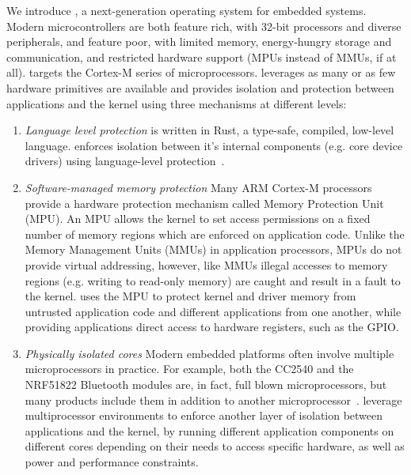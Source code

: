 We introduce \name, a next-generation operating system for embedded systems.
Modern microcontrollers are both feature rich, with 32-bit processors and
diverse peripherals, and feature poor, with limited memory, energy-hungry
storage and communication, and restricted hardware support (MPUs instead of
MMUs, if at all).
\name targets the Cortex-M series of microprocessors.  \name leverages as many
or as few hardware primitives are available and provides isolation and
protection between applications and the kernel using three mechanisms at
different levels:

\begin{enumerate}
  \item \emph{Language level protection} \name is written in Rust, a type-safe,
  compiled, low-level language. \name enforces isolation between it's
  internal components (e.g. core device drivers) using language-level
  protection~.
  
  \item \emph{Software-managed memory protection} Many ARM Cortex-M
  processors provide a hardware protection mechanism called Memory Protection
  Unit (MPU).  An MPU allows the kernel to set access permissions on a fixed
  number of memory regions which are enforced on application code. Unlike the
  Memory Management Units (MMUs) in application processors, MPUs do not provide
  virtual addressing, however, like MMUs illegal accesses to memory regions
  (e.g. writing to read-only memory) are caught and result in a fault to the
  kernel. \name uses the MPU to protect kernel and driver memory from untrusted
  application code and different applications from one another, while
  providing applications direct access to hardware registers, such as the
  GPIO.

  \item \emph{Physically isolated cores} Modern embedded platforms often
  involve multiple microprocessors in practice. For example, both the CC2540
  and the NRF51822 Bluetooth modules are, in fact, full blown microprocessors,
  but many products include them in addition to another
  microprocessor~. \name leverage
  multiprocessor environments to enforce another layer of isolation between
  applications and the kernel, by running different application components on
  different cores depending on their needs to access specific hardware, as
  well as power and performance constraints.

\end{enumerate}

